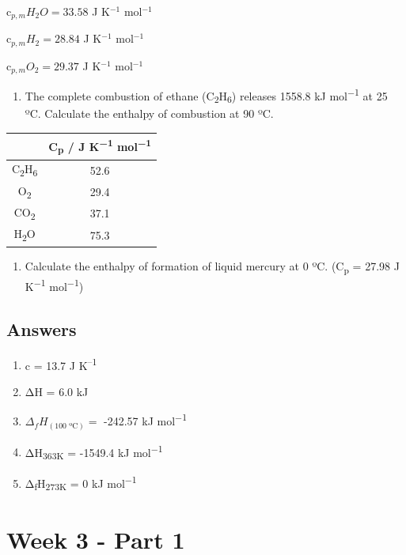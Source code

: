 \documentclass[
]{book}
\providecommand{\tightlist}{%
  \setlength{\itemsep}{0pt}\setlength{\parskip}{0pt}}
\begin{document}
c\(_{p,m} H_2 O = 33.58\) J K\(^{-1}\) mol\(^{-1}\)

c\(_{p,m} H_2 = 28.84\) J K\(^{-1}\) mol\(^{-1}\)

c\(_{p,m} O_2 = 29.37\) J K\(^{-1}\) mol\(^{-1}\)

\begin{enumerate}
\def\labelenumi{\arabic{enumi}.}
\setcounter{enumi}{3}
\tightlist
\item
  The complete combustion of ethane (C\textsubscript{2}H\textsubscript{6}) releases 1558.8 kJ mol\textsuperscript{−1} at 25 ºC. Calculate the enthalpy of combustion at 90 ºC.
\end{enumerate}

\begin{longtable}[]{@{}cc@{}}
\toprule
& C\textsubscript{p} / J K\textsuperscript{−1} mol\textsuperscript{−1}\tabularnewline
\midrule
\endhead
C\textsubscript{2}H\textsubscript{6} & 52.6\tabularnewline
O\textsubscript{2} & 29.4\tabularnewline
CO\textsubscript{2} & 37.1\tabularnewline
H\textsubscript{2}O & 75.3\tabularnewline
\bottomrule
\end{longtable}

\begin{enumerate}
\def\labelenumi{\arabic{enumi}.}
\setcounter{enumi}{4}
\tightlist
\item
  Calculate the enthalpy of formation of liquid mercury at 0 ºC. (C\textsubscript{p} = 27.98 J K\textsuperscript{−1} mol\textsuperscript{−1})
\end{enumerate}

\hypertarget{sec:w2p2ans}{%
\section{Answers}\label{sec:w2p2ans}}

\begin{enumerate}
\def\labelenumi{\arabic{enumi}.}
\tightlist
\item
  c = 13.7 J K\textsuperscript{--1}
\item
  ΔH = 6.0 kJ
\item
  \(\Delta _f H _{(\textrm{100 ºC})}=\) -242.57 kJ mol\textsuperscript{−1}
\item
  ΔH\textsubscript{363K} = -1549.4 kJ mol\textsuperscript{−1}
\item
  Δ\textsubscript{f}H\textsubscript{273K} = 0 kJ mol\textsuperscript{−1}
\end{enumerate}

\hypertarget{ch:Part5}{%
\chapter{Week 3 - Part 1}\label{ch:Part5}}
\end{document}
